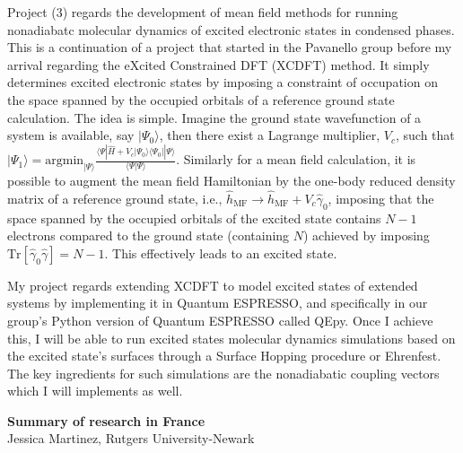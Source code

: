 \documentclass[notitlepage,12pt]{report}
\renewcommand{\ket}[1]{\left| #1 \right. \rangle}
\renewcommand{\bra}[1]{\langle \left. #1 \right|}
\renewcommand{\braket}[2]{\langle #1 \left| #2 \right. \rangle}
\newcommand{\braopket}[3]{\langle #1 \left| #2 \right| #3 \rangle}
\begin{document}
Project (3) regards the development of mean field methods for running nonadiabatc molecular dynamics of excited electronic states in condensed phases. This is a continuation of a project that started in the Pavanello group before my arrival regarding the eXcited Constrained DFT (XCDFT) method. It simply determines excited electronic states by imposing a constraint of occupation on the space spanned by the occupied orbitals of a reference ground state calculation. The idea is simple. Imagine the ground state wavefunction of a system is available, say $\ket{\Psi_0}$, then there exist a Lagrange multiplier, $V_c$, such that $\ket{\Psi_1}=\text{argmin}_{\ket{\Psi}} \frac{\braopket{\Psi}{\hat H + V_c \ket{\Psi_0}\bra{\Psi_0}}{\Psi}}{\braket{\Psi}{\Psi}}$. Similarly for a mean field calculation, it is possible to augment the mean field Hamiltonian by the one-body reduced density matrix of a reference ground state, i.e., $\hat h_\text{MF} \to \hat h_\text{MF} + V_c \hat\gamma_0$, imposing that the space spanned by the occupied orbitals of the excited state contains $N-1$ electrons compared to the ground state (containing $N$) achieved by imposing $\text{Tr}\left[ \hat\gamma_0 \hat\gamma \right]=N-1$. This effectively leads to an excited state.

My project regards extending XCDFT to model excited states of extended systems by implementing it in Quantum ESPRESSO, and specifically in our group's Python version of Quantum ESPRESSO called QEpy. Once I achieve this, I will be able to run excited states molecular dynamics simulations based on the excited state's surfaces through a Surface Hopping procedure or Ehrenfest. The key ingredients for such simulations are the nonadiabatic coupling vectors which I will implements as well. 

\newpage
\begin{center}
    \textbf{Summary of research in France}\\
    Jessica Martinez, Rutgers University-Newark
\end{center}
\end{document}
